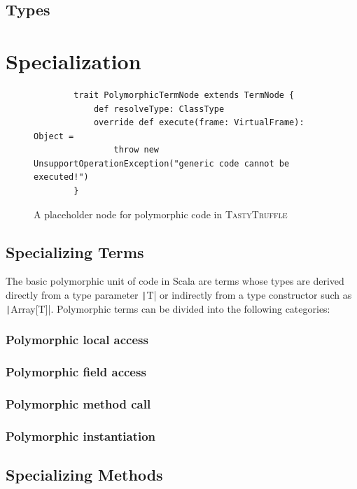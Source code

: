 \subsection*{Types}

\section{Specialization}
\label{implementation:specialization}

\begin{figure}[H]
	\begin{verbatim}
		trait PolymorphicTermNode extends TermNode {
			def resolveType: ClassType 
			override def execute(frame: VirtualFrame): Object = 
				throw new UnsupportOperationException("generic code cannot be executed!")
		}
	\end{verbatim}
	\caption{A placeholder node for polymorphic code in \textsc{TastyTruffle}}
\end{figure}

\subsection{Specializing Terms}

The basic polymorphic unit of code in Scala are terms whose types are derived directly from a type parameter \texttt|T| or indirectly from a type constructor such as \texttt|Array[T]|. Polymorphic terms can be divided into the following categories:

\subsubsection*{Polymorphic local access}
\subsubsection*{Polymorphic field access}
\subsubsection*{Polymorphic method call}
\subsubsection*{Polymorphic instantiation}


\subsection{Specializing Methods}

